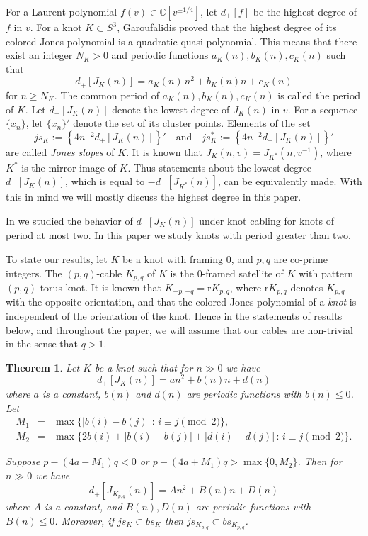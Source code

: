 \documentclass[11pt]{amsart}
\numberwithin{equation}{section}
\theoremstyle{plain}
\newtheorem{theorem}{Theorem}[section]
\theoremstyle{definition}
\newcommand{\K}{{K_{p, q}}}
\def\BC{\mathbb C}
\begin{document}
For a Laurent polynomial $f(v) \in \BC[v^{\pm 1/4}]$, let $d_+[f]$  be the highest degree of $f$ in $v$. For a knot $K \subset S^3$, Garoufalidis \cite{Ga-quasi} proved that the highest degree of its colored Jones polynomial is a quadratic quasi-polynomial. This means that there exist an integer $N_K>0$ and periodic functions $a_{K}(n), b_{K}(n), c_{K}(n)$ such that 
$$d_+[J_K(n)] = a_{K}(n) \, n^2 + b_{K}(n) n + c_{K}(n)$$
for $n \ge N_K$.  The common period of $a_{K}(n), b_{K}(n) ,  c_{K}(n)$ is called the period of $K$.
Let $d_-[J_K(n)]$ denote the lowest degree of $J_K(n)$ in $v$.
For a sequence $\{x_n\}$, let $\{x_n\}'$ denote the set of its cluster points. Elements of the set
$$js_K:= \left\{ 4n^{-2}d_+[J_K(n)]  \right\}' \quad
 \mbox{and} \quad js^*_K:= \left\{ 4n^{-2}d_-[J_K(n)] \right\}' $$
 are called {\em Jones slopes} of $K$. 
It is known that
 $J_K(n, v) = J_{K^*}(n, v^{-1})$, where $K^*$ is the mirror image of $K$. Thus statements about the lowest degree 
$d_-[J_K(n)]$, which is equal to $- d_+[J_{K^*}(n)]$,  can be equivalently made. With this in mind we will mostly discuss the highest degree in this paper.

In \cite {Effie-Anh-slope}  we studied the behavior of $d_+[J_K(n)]$ under knot cabling for knots of period at most two.
In this paper we study knots with period greater than two.

To state our results, let $K$ be a knot with framing 0, and $p,q$ are co-prime integers.
The $(p,q)$-cable $K_{p,q}$ of $K$ is the $0$-framed satellite of $K$ with
pattern $(p,q)$ torus knot. It is known that $K_{-p,-q}=\text{r}K_{p,q}$, where $\text{r}K_{p,q}$ denotes $\K$ with the opposite orientation, and that the colored Jones polynomial of a \textit{knot} is independent of the orientation of the knot. Hence in the statements of results below, and throughout the paper,  we will assume that our cables are non-trivial in the  sense  that $q>1$.


 \begin{theorem}
 \label{thm-quasi-constant}
 Let $K$ be a knot such that for $n \gg 0$ we have
$$
d_+[J_K(n)]=an^2+b(n)n+d(n)
$$
where $a$ is a constant, $b(n)$ and $d(n)$ are periodic functions with $b(n) \le 0$. Let \begin{eqnarray*}
M_1 &=&  \max\{|b(i)-b(j)| \, : \,  i \equiv j \pmod{2}\},\\
M_2 &=& \max\{2b(i) + |b(i)-b(j)| + |d(i)-d(j)| \, : \, i \equiv j \pmod{2}\}.
\end{eqnarray*}

Suppose $p- (4a-M_1)q < 0$ or $p- (4a + M_1)q > \max\{0,M_2\}$. Then for $n \gg 0$ we have
$$d_+[J_{\K}(n)]=An^2+B(n)n+D(n)$$
where $A$ is a constant, and $B(n), D(n)$ are periodic functions with $B(n) \le 0$. Moreover, if $js_K \subset bs_K$ then $js_{\K} \subset bs_{\K}$.
 \end{theorem}
\end{document}
